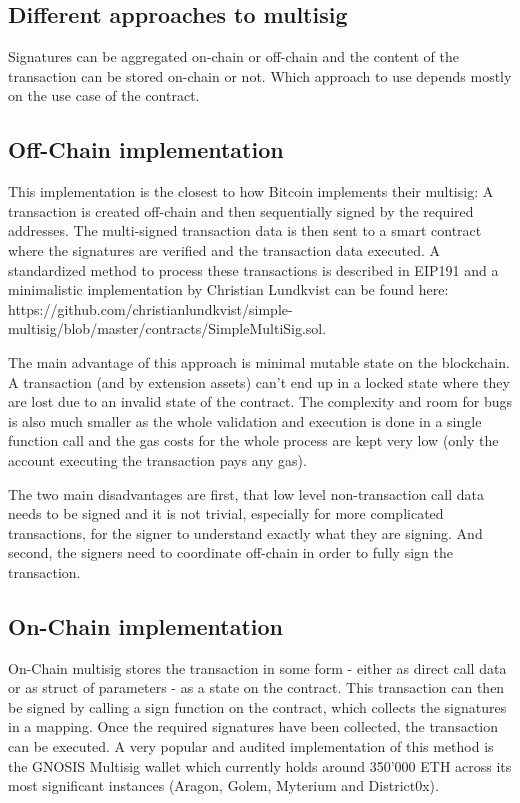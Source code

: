 \documentclass[12pt,a4paper,titlepage,oneside,english]{article}
\begin{document}
\subsection{Different approaches to multisig}
Signatures can be aggregated on-chain or off-chain and the content of the transaction can be stored on-chain or not. Which approach to use depends mostly on the use case of the contract.

\subsection{Off-Chain implementation}
This implementation is the closest to how Bitcoin implements their multisig: A transaction is created off-chain and then sequentially signed by the required addresses. The multi-signed transaction data is then sent to a smart contract where the signatures are verified and the transaction data executed. A standardized method to process these transactions is described in EIP191 and a minimalistic implementation by Christian Lundkvist can be found here: https://github.com/christianlundkvist/simple-multisig/blob/master/contracts/SimpleMultiSig.sol.

The main advantage of this approach is minimal mutable state on the blockchain. A transaction (and by extension assets) can't end up in a locked state where they are lost due to an invalid state of the contract. The complexity and room for bugs is also much smaller as the whole validation and execution is done in a single function call and the gas costs for the whole process are kept very low (only the account executing the transaction pays any gas).

The two main disadvantages are first, that low level non-transaction call data needs to be signed and it is not trivial, especially for more complicated transactions, for the signer to understand exactly what they are signing. And second, the signers need to coordinate off-chain in order to fully sign the transaction.

\subsection{On-Chain implementation}
On-Chain multisig stores the transaction in some form - either as direct call data or as struct of parameters - as a state on the contract. This transaction can then be signed by calling a sign function on the contract, which collects the signatures in a mapping. Once the required signatures have been collected, the transaction can be executed. A very popular and audited implementation of this method is the GNOSIS Multisig wallet which currently holds around 350'000 ETH across its most significant instances (Aragon, Golem, Myterium and District0x).
\end{document}
